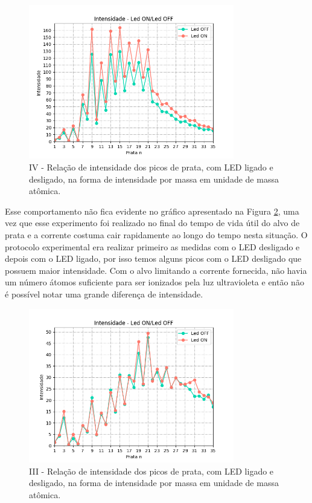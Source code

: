   \begin{figure}
  \centering  
  \includegraphics[width=0.8\textwidth]{exp_04/LED_ON_Led_OFF_intensidade_prata_N_.png}
  \caption{IV - Relação de intensidade dos picos de prata, com LED ligado e desligado, na forma de intensidade por massa em unidade de massa atômica.}
  \label{fig:exp_04_picos_LEDONOFF_N}
\end{figure}

Esse comportamento não fica evidente no gráfico apresentado na Figura \ref{fig:exp_03_picos_LEDONOFF_N}, uma vez que esse experimento foi realizado no final do tempo de vida útil do alvo de prata e a corrente costuma cair rapidamente ao longo do tempo nesta situação. O protocolo experimental era realizar primeiro as medidas com o LED desligado e depois com o LED ligado, por isso temos alguns picos com o LED desligado que possuem maior intensidade. Com o alvo limitando a corrente fornecida, não havia um número átomos suficiente para ser ionizados pela luz ultravioleta e então não é possível notar uma grande diferença de intensidade.  

\begin{figure}
  \centering  
  \includegraphics[width=0.8\textwidth]{exp_03/LED_ON_Led_OFF_intensidade_prata_N_.png}
  \caption{III - Relação de intensidade dos picos de prata, com LED ligado e desligado, na forma de intensidade por massa em unidade de massa atômica.}
  \label{fig:exp_03_picos_LEDONOFF_N}
\end{figure}